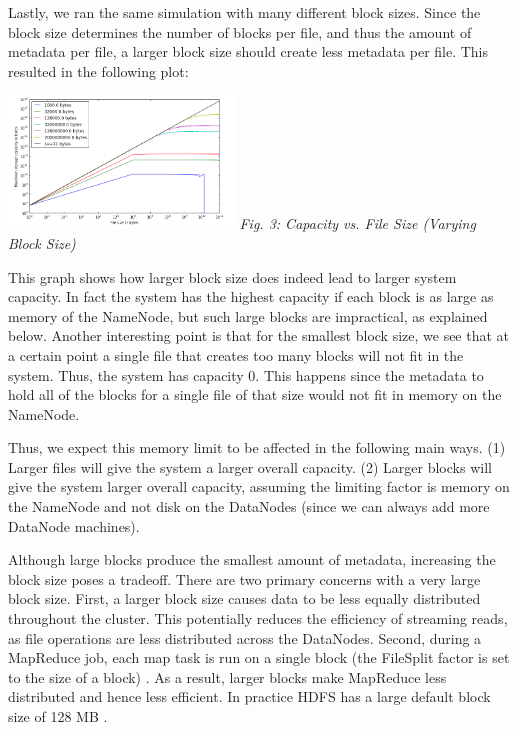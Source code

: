 \documentclass[11pt, a4paper]{article}
\begin{document}
\begin{multicols*}{2}
Lastly, we ran the same simulation with many different block sizes.  Since the block size determines the number of blocks per file, and thus the amount of metadata per file, a larger block size should create less metadata per file. This resulted in the following plot:
\begin{center}
	\includegraphics[keepaspectratio=true, width=0.45\textwidth]{variableBlockSize}	
	\textit{Fig. 3: Capacity vs. File Size (Varying Block Size)}
\end{center}

This graph shows how larger block size does indeed lead to larger system capacity. In fact the system has the highest capacity if each block is as large as memory of the NameNode, but such large blocks are impractical, as explained below. Another interesting point is that for the smallest block size, we see that at a certain point a single file that creates too many blocks will not fit in the system. Thus, the system has capacity 0. This happens since the metadata to hold all of the blocks for a single file of that size would not fit in memory on the NameNode. 

Thus, we expect this memory limit to be affected in the following main ways. (1) Larger files will give the system a larger overall capacity. (2) Larger blocks will give the system larger overall capacity, assuming the limiting factor is memory on the NameNode and not disk on the DataNodes (since we can always add more DataNode machines).

Although large blocks produce the smallest amount of metadata, increasing the block size poses a tradeoff. There are two primary concerns with a very large block size. First, a larger block size causes data to be less equally distributed throughout the cluster. This potentially reduces the efficiency of streaming reads, as file operations are less distributed across the DataNodes. Second, during a MapReduce job, each map task is run on a single block (the FileSplit factor is set to the size of a block) \cite{HdfsDefaults}. As a result, larger blocks make MapReduce less distributed and hence less efficient. In practice HDFS has a large default block size of 128 MB \cite{HdfsDefaults}.


\end{multicols*}
\end{document}
